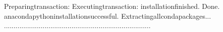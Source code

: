 \documentclass[a4paper,10pt,english]{sphinxmanual}
\begin{document}
\begin{sphinxVerbatim}[commandchars=\\\{\}]
Preparingtransaction:
Executingtransaction:
installationfinished.
\PYGZhy{}\PYGZhy{}\PYGZhy{}\PYGZhy{}\PYGZhy{}\PYGZhy{}\PYGZhy{}\PYGZhy{}\PYGZhy{}\PYGZhy{}\PYGZhy{}\PYGZhy{}\PYGZhy{}\PYGZhy{}\PYGZhy{}\PYGZhy{}\PYGZhy{}\PYGZhy{}\PYGZhy{}\PYGZhy{}\PYGZhy{}\PYGZhy{}\PYGZhy{}\PYGZhy{}\PYGZhy{}\PYGZhy{}\PYGZhy{}\PYGZhy{}\PYGZhy{}\PYGZhy{}\PYGZhy{}\PYGZhy{}\PYGZhy{}\PYGZhy{}\PYGZhy{}\PYGZhy{}\PYGZhy{}\PYGZhy{}\PYGZhy{}\PYGZhy{}\PYGZhy{}\PYGZhy{}\PYGZhy{}\PYGZhy{}\PYGZhy{}\PYGZhy{}\PYGZhy{}\PYGZhy{}\PYGZhy{}\PYGZhy{}\PYGZhy{}\PYGZhy{}\PYGZhy{}\PYGZhy{}\PYGZhy{}\PYGZhy{}\PYGZhy{}\PYGZhy{}\PYGZhy{}\PYGZhy{}\PYGZhy{}\PYGZhy{}\PYGZhy{}\PYGZhy{}\PYGZhy{}\PYGZhy{}\PYGZhy{}\PYGZhy{}\PYGZhy{}\PYGZhy{}\PYGZhy{}\PYGZhy{}
Done.
anacondapythoninstallationsuccessful.
\PYGZhy{}\PYGZhy{}\PYGZhy{}\PYGZhy{}\PYGZhy{}\PYGZhy{}\PYGZhy{}\PYGZhy{}\PYGZhy{}\PYGZhy{}\PYGZhy{}\PYGZhy{}\PYGZhy{}\PYGZhy{}\PYGZhy{}\PYGZhy{}\PYGZhy{}\PYGZhy{}\PYGZhy{}\PYGZhy{}\PYGZhy{}\PYGZhy{}\PYGZhy{}\PYGZhy{}\PYGZhy{}\PYGZhy{}\PYGZhy{}\PYGZhy{}\PYGZhy{}\PYGZhy{}\PYGZhy{}\PYGZhy{}\PYGZhy{}\PYGZhy{}\PYGZhy{}\PYGZhy{}\PYGZhy{}\PYGZhy{}\PYGZhy{}\PYGZhy{}\PYGZhy{}\PYGZhy{}\PYGZhy{}\PYGZhy{}\PYGZhy{}\PYGZhy{}\PYGZhy{}\PYGZhy{}\PYGZhy{}\PYGZhy{}\PYGZhy{}\PYGZhy{}\PYGZhy{}\PYGZhy{}\PYGZhy{}\PYGZhy{}\PYGZhy{}\PYGZhy{}\PYGZhy{}\PYGZhy{}\PYGZhy{}\PYGZhy{}\PYGZhy{}\PYGZhy{}\PYGZhy{}\PYGZhy{}\PYGZhy{}\PYGZhy{}\PYGZhy{}\PYGZhy{}\PYGZhy{}\PYGZhy{}
Extractingallcondapackages...
\PYGZhy{}\PYGZhy{}\PYGZhy{}\PYGZhy{}\PYGZhy{}\PYGZhy{}\PYGZhy{}\PYGZhy{}\PYGZhy{}\PYGZhy{}\PYGZhy{}\PYGZhy{}\PYGZhy{}\PYGZhy{}\PYGZhy{}\PYGZhy{}\PYGZhy{}\PYGZhy{}\PYGZhy{}\PYGZhy{}\PYGZhy{}\PYGZhy{}\PYGZhy{}\PYGZhy{}\PYGZhy{}\PYGZhy{}\PYGZhy{}\PYGZhy{}\PYGZhy{}\PYGZhy{}\PYGZhy{}\PYGZhy{}\PYGZhy{}\PYGZhy{}\PYGZhy{}\PYGZhy{}\PYGZhy{}\PYGZhy{}\PYGZhy{}\PYGZhy{}\PYGZhy{}\PYGZhy{}\PYGZhy{}\PYGZhy{}\PYGZhy{}\PYGZhy{}\PYGZhy{}\PYGZhy{}\PYGZhy{}\PYGZhy{}\PYGZhy{}\PYGZhy{}\PYGZhy{}\PYGZhy{}\PYGZhy{}\PYGZhy{}\PYGZhy{}\PYGZhy{}\PYGZhy{}\PYGZhy{}\PYGZhy{}\PYGZhy{}\PYGZhy{}\PYGZhy{}\PYGZhy{}\PYGZhy{}\PYGZhy{}\PYGZhy{}\PYGZhy{}\PYGZhy{}\PYGZhy{}\PYGZhy{}
............................................................................
\PYGZhy{}\PYGZhy{}\PYGZhy{}\PYGZhy{}\PYGZhy{}\PYGZhy{}\PYGZhy{}\PYGZhy{}\PYGZhy{}\PYGZhy{}\PYGZhy{}\PYGZhy{}\PYGZhy{}\PYGZhy{}\PYGZhy{}\PYGZhy{}\PYGZhy{}\PYGZhy{}\PYGZhy{}\PYGZhy{}\PYGZhy{}\PYGZhy{}\PYGZhy{}\PYGZhy{}\PYGZhy{}\PYGZhy{}\PYGZhy{}\PYGZhy{}\PYGZhy{}\PYGZhy{}\PYGZhy{}\PYGZhy{}\PYGZhy{}\PYGZhy{}\PYGZhy{}\PYGZhy{}\PYGZhy{}\PYGZhy{}\PYGZhy{}\PYGZhy{}\PYGZhy{}\PYGZhy{}\PYGZhy{}\PYGZhy{}\PYGZhy{}\PYGZhy{}\PYGZhy{}\PYGZhy{}\PYGZhy{}\PYGZhy{}\PYGZhy{}\PYGZhy{}\PYGZhy{}\PYGZhy{}\PYGZhy{}\PYGZhy{}\PYGZhy{}\PYGZhy{}\PYGZhy{}\PYGZhy{}\PYGZhy{}\PYGZhy{}\PYGZhy{}\PYGZhy{}\PYGZhy{}\PYGZhy{}\PYGZhy{}\PYGZhy{}\PYGZhy{}\PYGZhy{}\PYGZhy{}\PYGZhy{}

\end{sphinxVerbatim}
\end{document}
